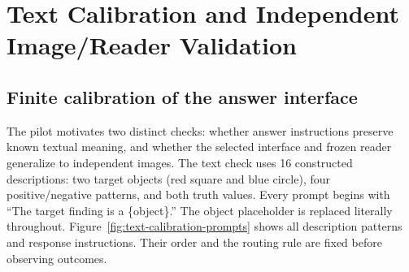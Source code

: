 \clearpage
\section{Text Calibration and Independent Image/Reader Validation}
\label{app:image-readout}

\subsection{Finite calibration of the answer interface}

The pilot motivates two distinct checks: whether answer instructions
preserve known textual meaning, and whether the selected interface and
frozen reader generalize to independent images. The text check uses 16
constructed descriptions: two target objects (red square and blue circle),
four positive/negative patterns, and both truth values. Every prompt begins
with ``The target finding is a \{object\}.'' The object placeholder is
replaced literally throughout. Figure~\ref{fig:text-calibration-prompts}
shows all description patterns and response instructions. Their order and
the routing rule are fixed before observing outcomes.

